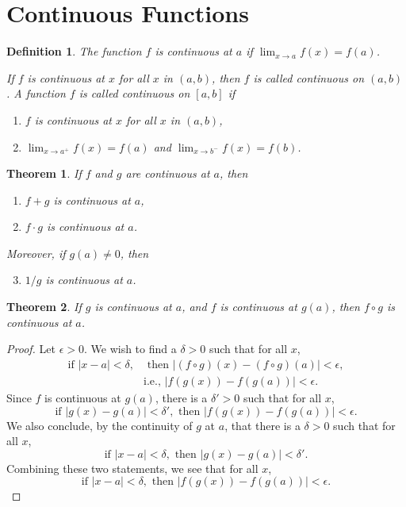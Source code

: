 \documentclass{article}
\numberwithin{definition}{subsection}
\newtheorem*{definition*}{Definition}
\numberwithin{lemma}{subsection}
\newtheorem{theorem}{Theorem}
\numberwithin{theorem}{subsection}
\begin{document}
\section{Continuous Functions}

\begin{definition*}
  The function $f$ is \emph{continuous at $a$} if $\lim_{x \to a} f(x) = f(a)$.

  If $f$ is continuous at $x$ for all $x$ in $(a, b)$, then $f$ is called
  \emph{continuous on $(a, b)$}. A function $f$ is called \emph{continuous on
  $[a, b]$} if
  \begin{enumerate}
    \item $f$ is continuous at $x$ for all $x$ in $(a, b)$,
    \item $\lim_{x \to a^+} f(x) = f(a)$ and $\lim_{x \to b^-} f(x) = f(b)$.
  \end{enumerate}
\end{definition*}

\begin{theorem}
  If $f$ and $g$ are continuous at $a$, then
  \begin{enumerate}
    \item $f + g$ is continuous at $a$,
    \item $f \cdot g$ is continuous at $a$.
  \end{enumerate}
  Moreover, if $g(a) \neq 0$, then
  \begin{enumerate}
    \setcounter{enumi}{2}
    \item $1/g$ is continuous at $a$.
  \end{enumerate}
\end{theorem}

\begin{theorem}
  If $g$ is continuous at $a$, and $f$ is continuous at $g(a)$, then $f \circ
  g$ is continuous at $a$.
\end{theorem}
\begin{proof}
  Let $\epsilon > 0$. We wish to find a $\delta > 0$ such that for all $x$,
  \begin{align*}
    \text{if } |x - a| < \delta, &\text{ then } |(f \circ g)(x) -
    (f \circ g)(a)| < \epsilon, \\
    &\text{i.e., } |f(g(x)) - f(g(a))| < \epsilon.
  \end{align*}
  Since $f$ is continuous at $g(a)$, there is a $\delta' > 0$ such that for all
  $x$, \[
    \text{if } |g(x) - g(a)| < \delta', \text{ then } |f(g(x)) - f(g(a))| <
      \epsilon.
  \] We also conclude, by the continuity of $g$ at $a$, that there is a $\delta
  > 0$ such that for all $x$, \[
    \text{if } |x - a| < \delta, \text{ then } |g(x) - g(a)| < \delta'.
  \] Combining these two statements, we see that for all $x$, \[
    \text{if } |x - a| < \delta, \text{ then } |f(g(x)) - f(g(a))| < \epsilon.
  \]
\end{proof}
\end{document}
